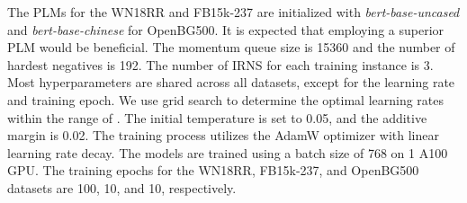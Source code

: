 \documentclass[11pt]{article}
\begin{document}
The PLMs for the WN18RR and FB15k-237 are initialized with \emph{bert-base-uncased} and \emph{bert-base-chinese} for OpenBG500. It is expected that employing a superior PLM would be beneficial. The momentum queue size is 15360 and the number of hardest negatives is 192. The number of IRNS for each training instance is 3. Most hyperparameters are shared across all datasets, except for the learning rate and training epoch. We use grid search to determine the optimal learning rates within the range of . The initial temperature  is set to 0.05, and the additive margin  is 0.02. The training process utilizes the AdamW optimizer with linear learning rate decay. The models are trained using a batch size of 768 on 1 A100 GPU. The training epochs for the WN18RR, FB15k-237, and OpenBG500 datasets are 100, 10, and 10, respectively.
\begin{table}[ht]
\centering
{}
\vspace{-5pt}
\caption{Results on the OpenBG500 dataset.
: results are from ~\citet{Deng2022ConstructionAA}.}
\label{tab:openbg}
\vspace{-10pt}
\end{table}
\end{document}
